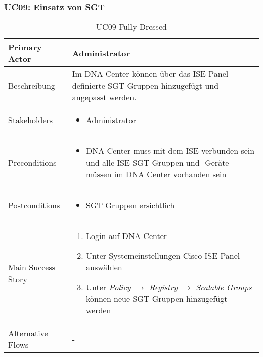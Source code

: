 \subsubsection{UC09: Einsatz von SGT}
\begin{table}[H]
	\centering
	\begin{tabularx}{\textwidth}{l | X}
		Primary Actor   & Administrator       \\
		\hline
		Beschreibung   & Im DNA Center können über das ISE Panel definierte SGT Gruppen hinzugefügt und angepasst werden.  \\ 
		\hline
		Stakeholders       & 
		\begin{itemize}
			\item Administrator
		\end{itemize} \\ 
		Preconditions      & 
		\begin{itemize}	
			\item DNA Center muss mit dem ISE verbunden sein und alle ISE SGT-Gruppen und -Geräte müssen im DNA Center vorhanden sein
		\end{itemize}  \\
		\hline
		Postconditions     & 
		\begin{itemize}	
			\item SGT Gruppen ersichtlich
		\end{itemize}  \\
		\hline
		Main Success Story & 
		\begin{enumerate}
			\item Login auf DNA Center
			\item Unter Systemeinstellungen Cisco ISE Panel auswählen
			\item Unter \textit{Policy $\rightarrow$ Registry $\rightarrow$ Scalable Groups} können neue SGT Gruppen hinzugefügt werden
		\end{enumerate}
		\\
		\hline
		Alternative Flows  & -
	\end{tabularx}
	\caption{UC09 Fully Dressed}
	\label{tab:UC09}
\end{table}

